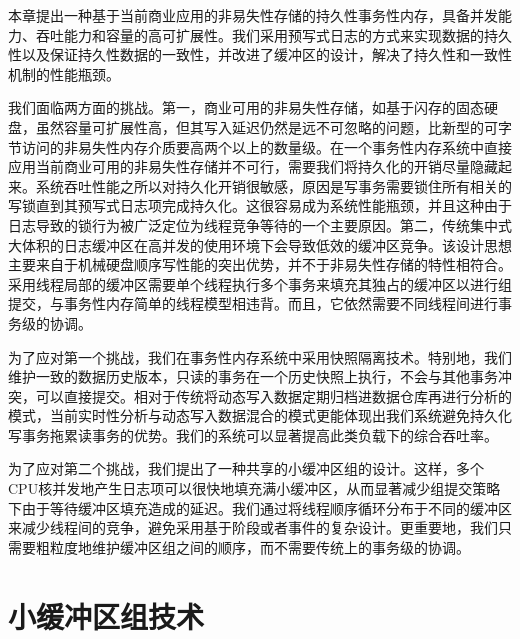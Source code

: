 本章提出一种基于当前商业应用的非易失性存储的持久性事务性内存，具备并发能力、吞吐能力和容量的高可扩展性。我们采用预写式日志的方式来实现数据的持久性以及保证持久性数据的一致性，并改进了缓冲区的设计，解决了持久性和一致性机制的性能瓶颈。

我们面临两方面的挑战。第一，商业可用的非易失性存储，如基于闪存的固态硬盘，虽然容量可扩展性高，但其写入延迟仍然是远不可忽略的问题，比新型的可字节访问的非易失性内存介质要高两个以上的数量级。在一个事务性内存系统中直接应用当前商业可用的非易失性存储并不可行，需要我们将持久化的开销尽量隐藏起来。系统吞吐性能之所以对持久化开销很敏感，原因是写事务需要锁住所有相关的写锁直到其预写式日志项完成持久化。这很容易成为系统性能瓶颈\cite{Chen:2009:FEF:1559845.1559855,
Johnson:2010:ASA:1920841.1920928, Johnson:2012:SWL:2205457.2205463,
Zheng:2014:FDF:2685048.2685085}，并且这种由于日志导致的锁行为\cite{Johnson:2010:ASA:1920841.1920928}被广泛定位为线程竞争等待的一个主要原因。第二，传统集中式大体积的日志缓冲区在高并发的使用环境下会导致低效的缓冲区竞争\cite{Johnson:2010:ASA:1920841.1920928,
Huang:2014:NLT:2735496.2735502}。该设计思想主要来自于机械硬盘顺序写性能的突出优势，并不于非易失性存储的特性相符合。采用线程局部的缓冲区\cite{Johnson:2012:SWL:2205457.2205463,
Zheng:2014:FDF:2685048.2685085, Wang:2014:SLT:2732951.2732960}需要单个线程执行多个事务来填充其独占的缓冲区以进行组提交，与事务性内存简单的线程模型相违背。而且，它依然需要不同线程间进行事务级的协调\cite{Johnson:2012:SWL:2205457.2205463,Wang:2014:SLT:2732951.2732960}。

为了应对第一个挑战，我们在事务性内存系统中采用快照隔离技术。特别地，我们维护一致的数据历史版本，只读的事务在一个历史快照上执行，不会与其他事务冲突，可以直接提交。相对于传统将动态写入数据定期归档进数据仓库再进行分析的模式，当前实时性分析与动态写入数据混合的模式\cite{ren2011querying,
Cheng:2012:KTP:2168836.2168846,4302625,Corbett:2012:SGG:2387880.2387905}更能体现出我们系统避免持久化写事务拖累读事务的优势。我们的系统可以显著提高此类负载下的综合吞吐率。

为了应对第二个挑战，我们提出了一种共享的小缓冲区组的设计。这样，多个CPU核并发地产生日志项可以很快地填充满小缓冲区，从而显著减少组提交策略下由于等待缓冲区填充造成的延迟。我们通过将线程顺序循环分布于不同的缓冲区来减少线程间的竞争，避免采用基于阶段或者事件的复杂设计。更重要地，我们只需要粗粒度地维护缓冲区组之间的顺序，而不需要传统上的事务级的协调。

\section{小缓冲区组技术}

